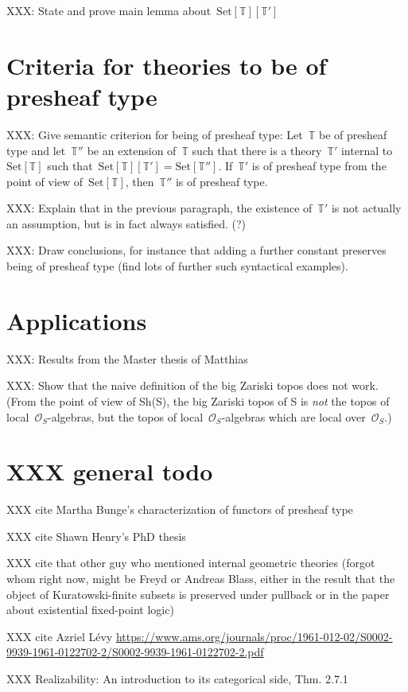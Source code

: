 \documentclass[oneside,reqno]{amsart}
\theoremstyle{definition}
\theoremstyle{plain}
\theoremstyle{remark}
\newcommand{\TT}{\mathbb{T}}
\renewcommand{\O}{\mathcal{O}}
\newcommand{\Set}{\mathrm{Set}}
\renewcommand{\_}{\mathpunct{.}\,}
\newcommand{\?}{\,{:}\,}
\begin{document}
XXX: State and prove main lemma about~$\Set[\TT][\TT']$


\section{Criteria for theories to be of presheaf type}

XXX: Give semantic criterion for being of presheaf type: Let~$\TT$ be of
presheaf type and let~$\TT''$ be an extension of~$\TT$ such that there is a
theory~$\TT'$ internal to~$\Set[\TT]$ such that~$\Set[\TT][\TT'] =
\Set[\TT'']$. If~$\TT'$ is of presheaf type from the point of view
of~$\Set[\TT]$, then~$\TT''$ is of presheaf type.

XXX: Explain that in the previous paragraph, the existence of~$\TT'$ is not
actually an assumption, but is in fact always satisfied. (?)

XXX: Draw conclusions, for instance that adding a further constant preserves
being of presheaf type (find lots of further such syntactical examples).


\section{Applications}

XXX: Results from the Master thesis of Matthias

XXX: Show that the naive definition of the big Zariski topos does not work.
(From the point of view of Sh(S), the big Zariski topos of S is \emph{not} the
topos of local~$\O_S$-algebras, but the topos of local~$\O_S$-algebras which
are local over~$\O_S$.)


\section{XXX general todo}

XXX cite Martha Bunge's characterization of functors of presheaf type

XXX cite Shawn Henry's PhD thesis

XXX cite that other guy who mentioned internal geometric theories (forgot whom
right now, might be Freyd or Andreas Blass, either in the result that the
object of Kuratowski-finite subsets is preserved under pullback or in the paper
about existential fixed-point logic)

XXX cite Azriel Lévy
\url{https://www.ams.org/journals/proc/1961-012-02/S0002-9939-1961-0122702-2/S0002-9939-1961-0122702-2.pdf}

XXX Realizability: An introduction to its categorical side, Thm. 2.7.1

\printbibliography
\end{document}
